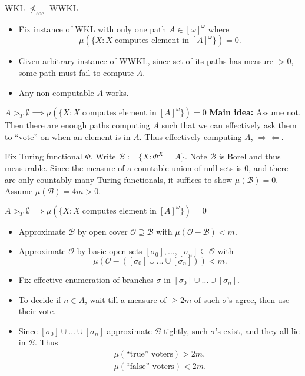 \begin{frame}{WKL $\nleq_{\text{soc}}$ WWKL}
  \begin{itemize}
    \item Fix instance of WKL with only one path $A\in[\omega]^\omega$ where
      \[\mu(\{X: X\; \text{computes element in}\; [A]^\omega\}) =0.\]
    \item Given arbitrary instance of WWKL, since set of its paths has
      measure $>0$, some path must fail to compute $A$.
    \item Any non-computable $A$ works.
  \end{itemize}
\end{frame}

\begin{frame}{$A>_T\emptyset \implies\mu(\{X: X\; \text{computes element
in}\; [A]^\omega\}) =0$}
  \textbf{Main idea:} Assume not. Then there are enough paths computing
  $A$ such that we can effectively ask them to ``vote''
  on when an element is in $A$. Thus effectively computing
  $A$, $\Rightarrow\Leftarrow$.
  \vspace{1em}

  Fix Turing functional $\Phi$. Write $\mathcal{B} :=\{X:
  \Phi^X=A\}$. Note $\mathcal{B}$ is Borel and thus measurable.
  Since the measure of a countable union of null sets is 0, and
  there are only countably many Turing functionals, it suffices to show
  $\mu(\mathcal{B})=0$. Assume $\mu(\mathcal{B})=4m>0$.
\end{frame}

\begin{frame}{$A>_T\emptyset \implies\mu(\{X: X\; \text{computes element
in}\; [A]^\omega\}) =0$}
  \begin{itemize}
    \item Approximate $\mathcal{B}$ by open cover
      $\mathcal{O}\supseteq\mathcal{B}$ with
      $\mu(\mathcal{O}-\mathcal{B})<m$.
    \item Approximate $\mathcal{O}$ by basic open sets
      $[\sigma_0],\ldots,[\sigma_n] \subseteq\mathcal{O}$ with
      \[\mu(\mathcal{O}-([\sigma_0]\cup\ldots\cup[\sigma_n])) <m.\]
    \item Fix effective enumeration of branches $\sigma$ in
      $[\sigma_0]\cup\ldots\cup[\sigma_n]$.
    \item To decide if $n\in A$, wait till a measure of $\geq2m$ of such
      $\sigma$'s agree, then use their vote.
    \item Since $[\sigma_0]\cup\ldots\cup[\sigma_n]$ approximate
      $\mathcal{B}$ tightly, such $\sigma$'s exist, and they all lie in
      $\mathcal{B}$. Thus
      \begin{align*}
        \mu(\text{``true'' voters})>2m,\\
        \mu(\text{``false'' voters})<2m.
      \end{align*}
  \end{itemize}
\end{frame}

